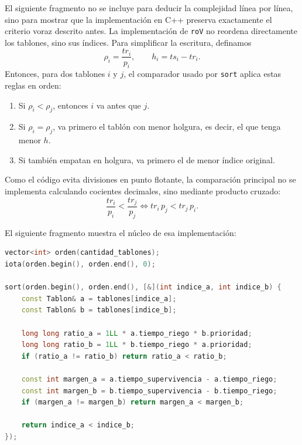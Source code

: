 \documentclass[12pt,a4paper]{article}
\begin{document}
El siguiente fragmento no se incluye para deducir la complejidad l\'inea por l\'inea, sino para mostrar que la implementaci\'on en C++ preserva exactamente el criterio voraz descrito antes. La implementaci\'on de \texttt{roV} no reordena directamente los tablones, sino sus \'indices. Para simplificar la escritura, definamos
\[
\rho_i=\frac{tr_i}{p_i},
\qquad
h_i=ts_i-tr_i.
\]
Entonces, para dos tablones \(i\) y \(j\), el comparador usado por \texttt{sort} aplica estas reglas en orden:
\begin{enumerate}
  \item Si \(\rho_i<\rho_j\), entonces \(i\) va antes que \(j\).
  \item Si \(\rho_i=\rho_j\), va primero el tabl\'on con menor holgura, es decir, el que tenga menor \(h\).
  \item Si tambi\'en empatan en holgura, va primero el de menor \'indice original.
\end{enumerate}

Como el c\'odigo evita divisiones en punto flotante, la comparaci\'on principal no se implementa calculando cocientes decimales, sino mediante producto cruzado:
\[
\frac{tr_i}{p_i}<\frac{tr_j}{p_j}
\iff
tr_i\,p_j < tr_j\,p_i.
\]

El siguiente fragmento muestra el n\'ucleo de esa implementaci\'on:

\begin{lstlisting}[style=bloquecodigo,language=C++]
vector<int> orden(cantidad_tablones);
iota(orden.begin(), orden.end(), 0);

sort(orden.begin(), orden.end(), [&](int indice_a, int indice_b) {
    const Tablon& a = tablones[indice_a];
    const Tablon& b = tablones[indice_b];

    long long ratio_a = 1LL * a.tiempo_riego * b.prioridad;
    long long ratio_b = 1LL * b.tiempo_riego * a.prioridad;
    if (ratio_a != ratio_b) return ratio_a < ratio_b;

    const int margen_a = a.tiempo_supervivencia - a.tiempo_riego;
    const int margen_b = b.tiempo_supervivencia - b.tiempo_riego;
    if (margen_a != margen_b) return margen_a < margen_b;

    return indice_a < indice_b;
});
\end{lstlisting}
\end{document}

